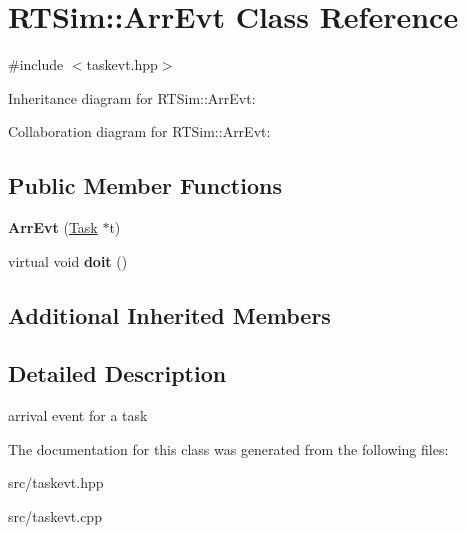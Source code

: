 \hypertarget{classRTSim_1_1ArrEvt}{}\section{R\+T\+Sim\+:\+:Arr\+Evt Class Reference}
\label{classRTSim_1_1ArrEvt}


{\ttfamily \#include $<$taskevt.\+hpp$>$}



Inheritance diagram for R\+T\+Sim\+:\+:Arr\+Evt\+:


Collaboration diagram for R\+T\+Sim\+:\+:Arr\+Evt\+:
\subsection*{Public Member Functions}
\begin{DoxyCompactItemize}
\item 
{\bfseries Arr\+Evt} (\hyperlink{classRTSim_1_1Task}{Task} $\ast$t)
\item 
virtual void {\bfseries doit} ()
\end{DoxyCompactItemize}
\subsection*{Additional Inherited Members}


\subsection{Detailed Description}
arrival event for a task 

The documentation for this class was generated from the following files\+:\begin{DoxyCompactItemize}
\item 
src/taskevt.\+hpp\item 
src/taskevt.\+cpp\end{DoxyCompactItemize}
